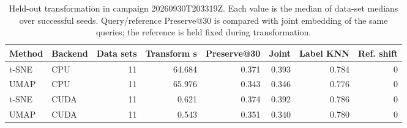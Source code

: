 \begin{table}[htbp]
\centering
\scriptsize
\caption{Held-out transformation in campaign 20260930T203319Z. Each value is the median of data-set medians over successful seeds. Query/reference Preserve@30 is compared with joint embedding of the same queries; the reference is held fixed during transformation.}
\label{tab:transform-results}
\begin{tabular}{llrrrrrr}
\toprule
Method & Backend & Data sets & Transform s & Preserve@30 & Joint & Label KNN & Ref. shift \\
\midrule
t-SNE & CPU & 11 & 64.684 & 0.371 & 0.393 & 0.784 & 0 \\
UMAP & CPU & 11 & 65.976 & 0.343 & 0.346 & 0.776 & 0 \\
t-SNE & CUDA & 11 & 0.621 & 0.374 & 0.392 & 0.786 & 0 \\
UMAP & CUDA & 11 & 0.543 & 0.351 & 0.340 & 0.780 & 0 \\
\bottomrule
\end{tabular}
\end{table}
